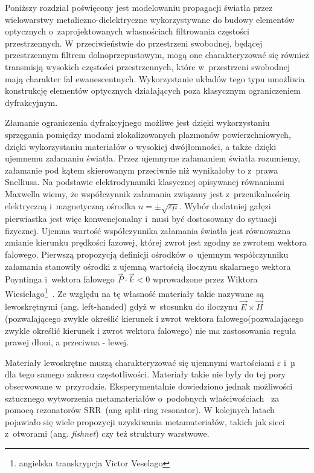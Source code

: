 Poniższy rozdział poświęcony jest modelowaniu propagacji światła przez wielowarstwy metaliczno-dielektryczne wykorzystywane do  budowy elementów optycznych o~zaprojektowanych własnościach filtrowania częstości przestrzennych. W przeciwieństwie do przestrzeni swobodnej, będącej przestrzennym filtrem dolnoprzepustowym, mogą one charakteryzować się również transmisją wysokich częstości przestrzennych, które w~przestrzeni swobodnej mają charakter fal ewanescentnych. Wykorzystanie układów tego typu umożliwia konstrukcję elementów optycznych działających poza klasycznym ograniczeniem dyfrakcyjnym.

Złamanie ograniczenia dyfrakcyjnego możliwe jest dzięki wykorzystaniu sprzęgania pomiędzy modami zlokalizowanych plazmonów powierzchniowych, dzięki wykorzystaniu materiałów o wysokiej dwójłomności, a także dzięki ujemnemu załamaniu światła. Przez ujemnyme załamaniem światła rozumiemy, załamanie pod kątem skierowanym przeciwnie niż wynikałoby to z~prawa Snelliusa. Na podstawie elektrodynamiki klasycznej opisywanej równaniami \nohyphens{Maxwella} wiemy, że współczynnik załamania związany jest z~przenikalnością elektryczną i~magnetyczną ośrodka $n = \pm \sqrt{ \varepsilon \mu}$. Wybór dodatniej gałęzi pierwiastka jest więc konwencjonalny i~musi być dostosowany do sytuacji fizycznej. Ujemna wartość współczynnika załamania światła jest równoważna zmianie kierunku prędkości fazowej, której zwrot jest zgodny ze zwrotem wektora falowego. Pierwszą propozycją definicji ośrodków o~ujemnym współczynniku załamania stanowiły ośrodki z ujemną wartością iloczynu skalarnego wektora Poyntinga i~wektora falowego $\vec{P} \cdot \vec{k} < 0$ wprowadzone przez Wiktora Wiesiełago\footnote{angielska transkrypcja Victor Veselago}~\cite{veselago1968electrodynamics}. Ze względu na tę własność materiały takie nazywane są lewoskrętnymi (ang. left-handed) gdyż w~stosunku do iloczynu $\vec{E} \times \vec{H}$(pozwalającego zwykle określić kierunek i zwrot wektora falowego(pozwalającego zwykle określić kierunek i zwrot wektora falowego) nie ma zastosowania reguła prawej dłoni, a przeciwna - lewej.

Materiały lewoskrętne muszą charakteryzować się ujemnymi wartościami $\varepsilon$ i~µ dla tego samego zakresu częstotliwości. Materiały takie nie były do tej pory obserwowane w~przyrodzie. Eksperymentalnie dowiedziono jednak możliwości sztucznego wytworzenia metamateriałów o~podobnych właściwościach~\cite{PhysRevLett.84.4184} za pomocą rezonatorów SRR~(ang split-ring resonator). W kolejnych latach pojawiało się wiele propozycji uzyskiwania metamateriałów, takich jak sieci z~otworami (ang. \textit{fishnet}) czy też struktury warstwowe.

